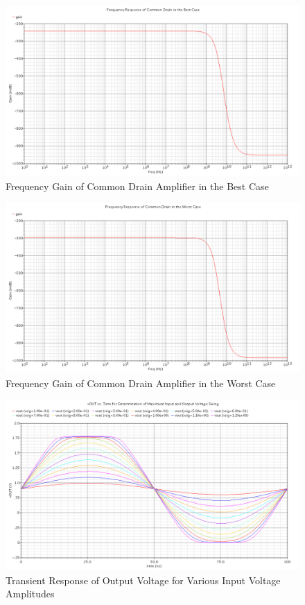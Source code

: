 \documentclass{article}
\begin{document}
\begin{figure}[H]
\centering
\includegraphics[width=6in]{2_cd_gain_ff.png}
\caption{Frequency Gain of Common Drain Amplifier in the Best Case}
\label{cd_ff}
\end{figure}

\begin{figure}[H]
\centering
\includegraphics[width=6in]{2_cd_gain_ss.png}
\caption{Frequency Gain of Common Drain Amplifier in the Worst Case}
\label{cd_ss}
\end{figure}

\begin{figure}[H]
\centering
\includegraphics[width=6in]{2_cd_transient.png}
\caption{Transient Response of Output Voltage for Various Input Voltage Amplitudes}
\label{cd_tran}
\end{figure}
\end{document}

